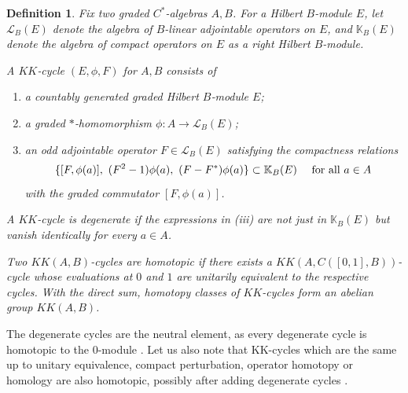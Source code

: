 \documentclass[12pt]{amsart}
\newtheorem{definition}[theorem]{Definition}
\newcommand{\KM}{{\mathbb K}}
\newcommand{\Ll}{{\mathcal L}}
\begin{document}
\begin{definition}
Fix two graded $C^*$-algebras $A,B$. 
For a Hilbert $B$-module $E$, let $\Ll_B(E)$ denote the algebra of $B$-linear adjointable operators on $E$, and $\KM_B(E)$ denote the algebra of compact operators on $E$ as a right Hilbert $B$-module.

A $KK$‑cycle $(E,\phi,F)$ for $A, B$ consists of
\begin{enumerate}
    \item[(i)] a countably generated graded Hilbert $B$‑module $E$;
    \item[(ii)] a graded $*$‑homomorphism $\phi:A\to \Ll_B(E)$;
    \item[(iii)] an odd adjointable operator $F\in \Ll_B(E)$ 
   satisfying the compactness relations
   \[\{[F,\phi(a)],\ (F^2-1)\phi(a),\ (F-F^*)\phi(a)\} \subset \KM_B(E) \quad \hbox{ for all } a\in A\]
   with the graded commutator $[F,\phi(a)]$.
\end{enumerate}
A $KK$-cycle is \emph{degenerate} if the expressions in (iii) are not just in $\KM_B(E)$ but vanish identically for every $a\in A$.

\noindent Two $KK(A,B)$-cycles are \emph{homotopic} if there exists a $KK(A,C([0,1],B))$-cycle whose evaluations at $0$ and $1$ are unitarily equivalent to the respective cycles.
\noindent With the direct sum, homotopy classes of $KK$-cycles form an abelian group $KK(A,B)$.
\end{definition}
The degenerate cycles are the neutral element, as every degenerate cycle is homotopic to the $0$-module \cite[Lemma 17.2.3]{blackadar1998k}. Let us also note that KK-cycles which are the same up to unitary equivalence, compact perturbation, operator homotopy or homology are also homotopic, possibly after adding degenerate cycles \cite[Section 17.2]{blackadar1998k}. 
\end{document}

